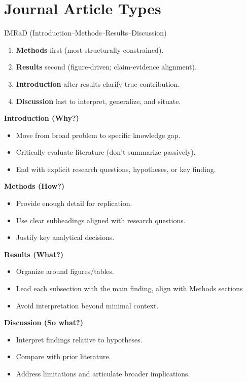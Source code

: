 \documentclass{beamer}
\begin{document}
\section{Journal Article Types}

\begin{frame}{IMRaD (Introduction–Methods–Results–Discussion)}
    \fontsize{9pt}{10pt}\selectfont

\begin{enumerate}
    \item \textbf{Methods} first (most structurally constrained).
    \item \textbf{Results} second (figure-driven; claim-evidence alignment).
    \item \textbf{Introduction} after results clarify true contribution.
    \item \textbf{Discussion} last to interpret, generalize, and situate.
\end{enumerate}

\vspace{0.4em}

\textbf{Introduction (Why?)}
\begin{itemize}
    \item Move from broad problem to specific knowledge gap.
    \item Critically evaluate literature (don't summarize passively).
    \item End with explicit research questions, hypotheses, or key finding.
\end{itemize}

\textbf{Methods (How?)}
\begin{itemize}
    \item Provide enough detail for replication.
    \item Use clear subheadings aligned with research questions.
    \item Justify key analytical decisions.
\end{itemize}

\textbf{Results (What?)}
\begin{itemize}
    \item Organize around figures/tables.
    \item Lead each subsection with the main finding, align with Methods sections
    \item Avoid interpretation beyond minimal context.
\end{itemize}

\textbf{Discussion (So what?)}
\begin{itemize}
    \item Interpret findings relative to hypotheses.
    \item Compare with prior literature.
    \item Address limitations and articulate broader implications.
\end{itemize}

\end{frame}
\end{document}
